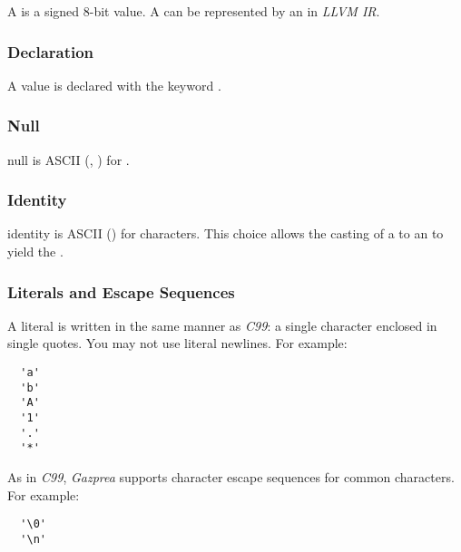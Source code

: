 \documentclass[types.tex]{subfiles}
\begin{document}
A  is a signed 8-bit value. A  can be represented by an 
in \textit{LLVM IR}.

\subsubsection{Declaration}
\label{sssec:character_decl}
A  value is declared with the keyword .

\subsubsection{Null}
\label{sssec:character_null}
\textsf{null} is ASCII  (, ) for .

\subsubsection{Identity}
\label{sssec:character_ident}
\textsf{identity} is ASCII  () for characters. This choice allows the casting
of a  to an  to yield the  .

\subsubsection{Literals and Escape Sequences}
\label{sssec:character_lit}
A  literal is written in the same manner as \textit{C99}: a single character
enclosed in single quotes. You may not use literal newlines. For example:
\begin{lstlisting}
  'a'
  'b'
  'A'
  '1'
  '.'
  '*'
\end{lstlisting}

As in \textit{C99}, \textit{Gazprea} supports character escape sequences for common characters. For
example:
\begin{lstlisting}
  '\0'
  '\n'
\end{lstlisting}
\end{document}
